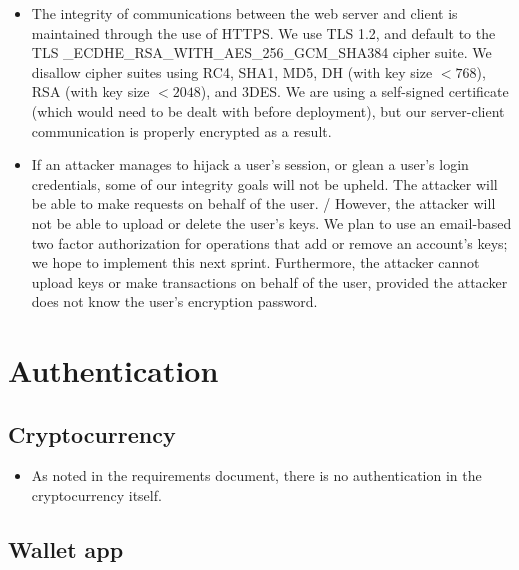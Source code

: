\documentclass[a4paper,12pt]{article}
\begin{document}
\begin{itemize}
\item The integrity of communications between the web server and client is maintained through the use of HTTPS. We use TLS 1.2, and default to the TLS \_ECDHE\_RSA\_WITH\_AES\_256\_GCM\_SHA384 cipher suite.
We disallow cipher suites using RC4, SHA1, MD5, DH (with key size $< 768$), RSA (with key size $< 2048$), and 3DES. We are using a self-signed certificate (which would need to be dealt with before deployment), but our server-client communication is properly encrypted as a result.
\item If an attacker manages to hijack a user's session, or glean a user's login credentials, some of our integrity goals will not be upheld. 
The attacker will be able to make requests on behalf of the user. 
/%
However, the attacker will not be able to upload or delete the user's keys. 
We plan to use an email-based two factor authorization for operations that add or remove an account's keys; we hope to implement this next sprint. 
Furthermore, the attacker cannot upload keys or make transactions on behalf of the user, provided the attacker does not know the user's encryption password.
\end{itemize}

\section{Authentication}

\subsection{Cryptocurrency}

\begin{itemize}
\item As noted in the requirements document, there is no authentication in the cryptocurrency itself.
\end{itemize}

\subsection{Wallet app}
\end{document}

